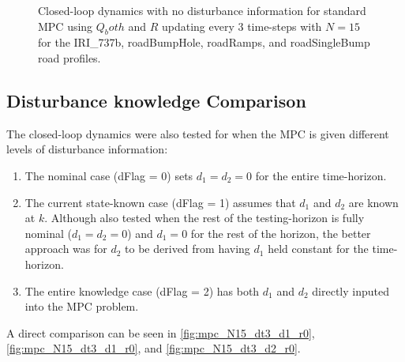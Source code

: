 \documentclass[onecolumn]{IEEEtran}
\begin{document}
\begin{figure}[h]
    \caption{Closed-loop dynamics with no disturbance information for standard MPC using $Q_both$ and $R$ updating every 3 time-steps with $N=15$ for the IRI\_737b, roadBumpHole, roadRamps, and roadSingleBump road profiles.} \label{fig:mpc_N15_dt3_d0_r0}
\end{figure}

\subsection{Disturbance knowledge Comparison}
The closed-loop dynamics were also tested for when the MPC is given different levels of disturbance information:
\begin{enumerate}
    \item The nominal case (dFlag = 0) sets $d_1 = d_2 = 0$ for the entire time-horizon.
    \item The current state-known case (dFlag = 1) assumes that $d_1$ and $d_2$ are known at $k$. Although also tested when the rest of the testing-horizon is fully nominal ($d_1 = d_2 = 0$) and $d_1 = 0$ for the rest of the horizon, the better approach was for $d_2$ to be derived from having $d_1$ held constant for the time-horizon.
    \item The entire knowledge case (dFlag = 2) has both $d_1$ and $d_2$ directly inputed into the MPC problem.
\end{enumerate}

A direct comparison can be seen in \autoref{fig:mpc_N15_dt3_d1_r0},\autoref{fig:mpc_N15_dt3_d1_r0}, and \autoref{fig:mpc_N15_dt3_d2_r0}. 
\end{document}
